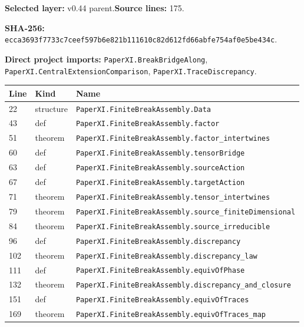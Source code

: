 \documentclass[10pt,oneside]{book}
\begin{document}
\textbf{Selected layer:} v0.44 parent.\quad\textbf{Source lines:} 175.\par\textbf{SHA-256:} {\scriptsize\nolinkurl{ecca3693f7733c7ceef597b6e821b111610c82d612fd66abfe754af0e5be434c}}.


\textbf{Direct project imports:} \nolinkurl{PaperXI.BreakBridgeAlong}, \nolinkurl{PaperXI.CentralExtensionComparison}, \nolinkurl{PaperXI.TraceDiscrepancy}.

\begin{longtable}{@{}p{}p{}p{}@{}}\toprule Line&Kind&Name\\\midrule\endhead

22&structure&\nolinkurl{PaperXI.FiniteBreakAssembly.Data}\\

43&def&\nolinkurl{PaperXI.FiniteBreakAssembly.factor}\\

51&theorem&\nolinkurl{PaperXI.FiniteBreakAssembly.factor_intertwines}\\

60&def&\nolinkurl{PaperXI.FiniteBreakAssembly.tensorBridge}\\

63&def&\nolinkurl{PaperXI.FiniteBreakAssembly.sourceAction}\\

67&def&\nolinkurl{PaperXI.FiniteBreakAssembly.targetAction}\\

71&theorem&\nolinkurl{PaperXI.FiniteBreakAssembly.tensor_intertwines}\\

79&theorem&\nolinkurl{PaperXI.FiniteBreakAssembly.source_finiteDimensional}\\

84&theorem&\nolinkurl{PaperXI.FiniteBreakAssembly.source_irreducible}\\

96&def&\nolinkurl{PaperXI.FiniteBreakAssembly.discrepancy}\\

102&theorem&\nolinkurl{PaperXI.FiniteBreakAssembly.discrepancy_law}\\

111&def&\nolinkurl{PaperXI.FiniteBreakAssembly.equivOfPhase}\\

132&theorem&\nolinkurl{PaperXI.FiniteBreakAssembly.discrepancy_and_closure}\\

151&def&\nolinkurl{PaperXI.FiniteBreakAssembly.equivOfTraces}\\

169&theorem&\nolinkurl{PaperXI.FiniteBreakAssembly.equivOfTraces_map}\\

\bottomrule\end{longtable}
\end{document}
